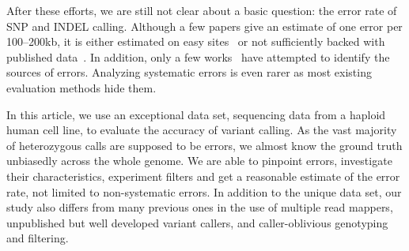 \documentclass{bioinfo-ori}
\begin{document}
After these efforts, we are still not clear about a basic question: the error
rate of SNP and INDEL calling. Although a few papers give an estimate of one
error per 100--200kb, it is either estimated on easy
sites~\citep{Bentley:2008cr} or not sufficiently backed with published
data~\citep{Nickles:2012aa}. In addition, only a few
works~\citep{Larson:2012aa,Roberts:2013aa,Kim:2013aa} have attempted to
identify the sources of errors. Analyzing systematic errors is even rarer as
most existing evaluation methods hide them.

In this article, we use an exceptional data set, sequencing data from a
haploid human cell line, to evaluate the accuracy of variant calling. As the
vast majority of heterozygous calls are supposed to be errors, we almost know
the ground truth unbiasedly across the whole genome. We are able to pinpoint
errors, investigate their characteristics, experiment filters and get a
reasonable estimate of the error rate, not limited to non-systematic errors. In
addition to the unique data set, our study also differs from many previous ones
in the use of multiple read mappers, unpublished but well developed variant
callers, and caller-oblivious genotyping and filtering.
\end{document}

